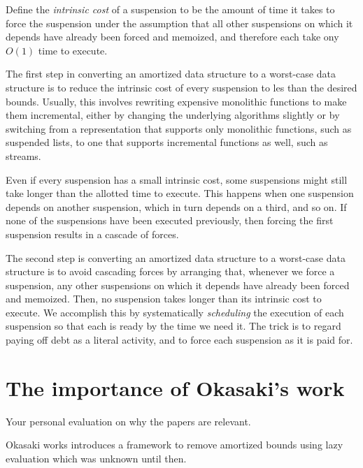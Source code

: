 \documentclass[12pt, a4paper]{article} %
\begin{document}
Define the \textit{intrinsic cost} of a suspension to be the amount of time it takes to force the suspension under the assumption that all other suspensions on which it depends have already been forced and memoized, and therefore each take ony $O(1)$ time to execute.

The first step in converting an amortized data structure to a worst-case data structure is to reduce the intrinsic cost of every suspension to les than the desired bounds. Usually, this involves rewriting expensive monolithic functions to make them incremental, either by changing the underlying algorithms slightly or by switching from a representation that supports only monolithic functions, such as suspended lists, to one that supports incremental functions as well, such as streams.

Even if every suspension has a small intrinsic cost, some suspensions might still take longer than the allotted time to execute. This happens when one suspension depends on another suspension, which in turn depends on a third, and so on. If none of the suspensions have been executed previously, then forcing the first suspension results in a cascade of forces.

The second step is converting an amortized data structure to a worst-case data structure is to avoid cascading forces by arranging that, whenever we force a suspension, any other suspensions on which it depends have already been forced and memoized. Then, no suspension takes longer than its intrinsic cost to execute. We accomplish this by systematically \textit{scheduling} the execution of each suspension so that each is ready by the time we need it. The trick is to regard paying off debt as a literal activity, and to force each suspension as it is paid for.















\section{The importance of Okasaki's work}%
\label{sec:importance}

Your personal evaluation on why the papers are relevant.

Okasaki works introduces a framework to remove amortized bounds using lazy evaluation which was unknown until then.
\end{document}
